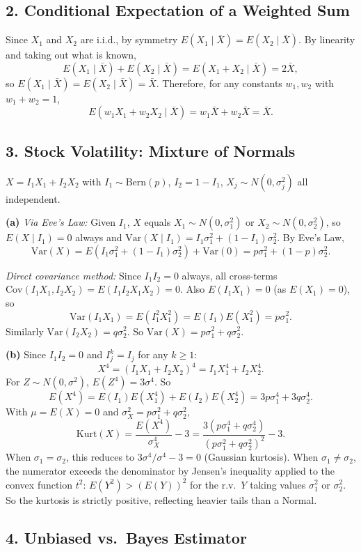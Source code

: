 \documentclass{article}
\begin{document}
\subsection*{2. Conditional Expectation of a Weighted Sum}

Since $X_1$ and $X_2$ are i.i.d., by symmetry $E(X_1\mid\bar X)=E(X_2\mid\bar X)$. By linearity and taking out what is known,
$$
E(X_1\mid\bar X)+E(X_2\mid\bar X)=E(X_1+X_2\mid\bar X)=2\bar X,
$$
so $E(X_1\mid\bar X)=E(X_2\mid\bar X)=\bar X$. Therefore, for any constants $w_1,w_2$ with $w_1+w_2=1$,
$$
E(w_1X_1+w_2X_2\mid\bar X)=w_1\bar X+w_2\bar X=\bar X.
$$

\subsection*{3. Stock Volatility: Mixture of Normals}

$X=I_1X_1+I_2X_2$ with $I_1\sim\text{Bern}(p)$, $I_2=1-I_1$, $X_j\sim N(0,\sigma_j^2)$ all independent.

\textbf{(a)} \emph{Via Eve's Law:} Given $I_1$, $X$ equals $X_1\sim N(0,\sigma_1^2)$ or $X_2\sim N(0,\sigma_2^2)$, so $E(X\mid I_1)=0$ always and $\text{Var}(X\mid I_1)=I_1\sigma_1^2+(1-I_1)\sigma_2^2$. By Eve's Law,
$$
\text{Var}(X)=E(I_1\sigma_1^2+(1-I_1)\sigma_2^2)+\text{Var}(0)=p\sigma_1^2+(1-p)\sigma_2^2.
$$

\emph{Direct covariance method:} Since $I_1 I_2=0$ always, all cross-terms $\text{Cov}(I_1X_1,I_2X_2)=E(I_1I_2X_1X_2)=0$. Also $E(I_1X_1)=0$ (as $E(X_1)=0$), so
$$
\text{Var}(I_1X_1)=E(I_1^2X_1^2)=E(I_1)E(X_1^2)=p\sigma_1^2.
$$
Similarly $\text{Var}(I_2X_2)=q\sigma_2^2$. So $\text{Var}(X)=p\sigma_1^2+q\sigma_2^2$.

\textbf{(b)} Since $I_1I_2=0$ and $I_j^k=I_j$ for any $k\ge1$:
$$
X^4=(I_1X_1+I_2X_2)^4=I_1X_1^4+I_2X_2^4.
$$
For $Z\sim N(0,\sigma^2)$, $E(Z^4)=3\sigma^4$. So
$$
E(X^4)=E(I_1)E(X_1^4)+E(I_2)E(X_2^4)=3p\sigma_1^4+3q\sigma_2^4.
$$
With $\mu=E(X)=0$ and $\sigma_X^2=p\sigma_1^2+q\sigma_2^2$,
$$
\text{Kurt}(X)=\frac{E(X^4)}{\sigma_X^4}-3=\frac{3(p\sigma_1^4+q\sigma_2^4)}{(p\sigma_1^2+q\sigma_2^2)^2}-3.
$$
When $\sigma_1=\sigma_2$, this reduces to $3\sigma^4/\sigma^4-3=0$ (Gaussian kurtosis). When $\sigma_1\ne\sigma_2$, the numerator exceeds the denominator by Jensen's inequality applied to the convex function $t^2$: $E(Y^2)>(E(Y))^2$ for the r.v.\ $Y$ taking values $\sigma_1^2$ or $\sigma_2^2$. So the kurtosis is strictly positive, reflecting heavier tails than a Normal.

\subsection*{4. Unbiased vs.\ Bayes Estimator}
\end{document}
